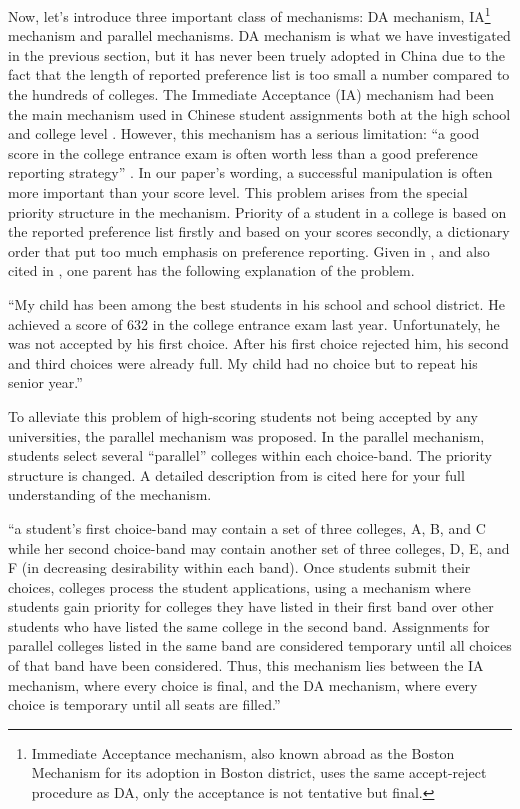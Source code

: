 Now, let's introduce three important class of mechanisms: DA mechanism, IA\footnote{Immediate Acceptance mechanism, also known abroad as the Boston Mechanism for its adoption in Boston district, uses the same accept-reject procedure as DA, only the acceptance is not tentative but final.}
mechanism and parallel mechanisms. DA mechanism is what we have investigated in the previous section, but it has never been truely adopted in China
due to the fact that the length of reported preference list is too small a number compared to the hundreds of colleges. The Immediate Acceptance (IA)
mechanism  had been the main mechanism used in Chinese
student assignments both at the high school and college
level \parencite{Nie2007b}. However, this mechanism has a serious
limitation: “a good score in the college entrance exam is often worth less
than a good preference reporting strategy” \parencite{Nie2007a}. In our paper's wording, a successful
manipulation is often more important than your score level. This
problem arises from the special priority structure in the
mechanism. Priority of a student in a college is based on the
reported preference list firstly and based on your scores secondly, a
dictionary order that put too much emphasis on preference
reporting. Given in \parencite{Nie2007b}, and also cited
in \parencite{YanChenJPE}, one parent has the following explanation of
the problem.

``My child has been among the best students in his school and school district. He
achieved a score of 632 in the college entrance exam last year. Unfortunately, he was
not accepted by his first choice. After his first choice rejected him, his second and third
choices were already full. My child had no choice but to repeat his senior year.''

To alleviate this problem of high-scoring students not being accepted by any universities, the
parallel mechanism was proposed. 
In the parallel mechanism, students select several
“parallel” colleges within each choice-band. The priority structure is changed. A detailed description from \parencite{YanChenJPE} is cited here for your full understanding of the mechanism.

``a student’s first choice-band may
contain a set of three colleges, A, B, and C while her second choice-band may contain another set
of three colleges, D, E, and F (in decreasing desirability within each band). Once students submit
their choices, colleges process the student applications, using a mechanism where students gain
priority for colleges they have listed in their first band over other students who have listed the same
college in the second band. Assignments for parallel colleges listed in the same band are considered
temporary until all choices of that band have been considered. Thus, this mechanism lies between
the IA mechanism, where every choice is final, and the DA mechanism, where every choice is
temporary until all seats are filled.''

